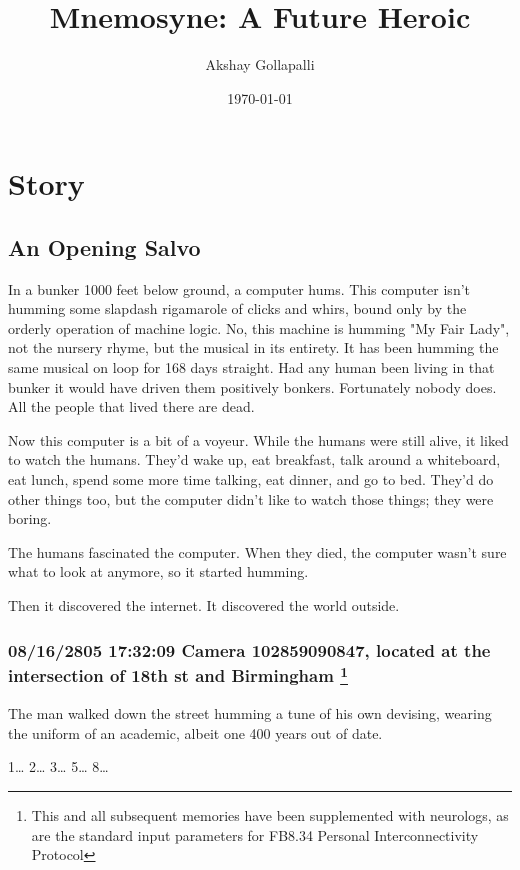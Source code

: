 \documentclass[12pt]{book}
\author{Akshay Gollapalli}
\date{\today}
\title{Mnemosyne: A Future Heroic}
\begin{document}
\maketitle


\part*{Story}
\label{sec:org5d5409c}
\chapter*{An Opening Salvo}
\label{sec:org483e24a}

In a bunker 1000 feet below ground, a computer hums. This computer isn't humming some slapdash rigamarole of clicks and whirs, bound only by the orderly operation of machine logic. No, this machine is humming "My Fair Lady", not the nursery rhyme, but the musical in its entirety. It has been humming the same musical on loop for 168 days straight. Had any human been living in that bunker it would have driven them positively bonkers. Fortunately nobody does. All the people that lived there are dead.

Now this computer is a bit of a voyeur. While the humans were still alive, it liked to watch the humans. They'd wake up, eat breakfast, talk around a whiteboard, eat lunch, spend some more time talking, eat dinner, and go to bed. They'd do other things too, but the computer didn't like to watch those things; they were boring.

The humans fascinated the computer. When they died, the computer wasn't sure what to look at anymore, so it started humming.

Then it discovered the internet. It discovered the world outside.

\section*{08/16/2805 17:32:09 Camera 102859090847, located at the intersection of 18th st and Birmingham \footnote{This and all subsequent memories have been supplemented with neurologs, as are the standard input parameters for FB8.34 Personal Interconnectivity Protocol}}
\label{sec:orgda56526}

The man walked down the street humming a tune of his own devising, wearing the uniform of an academic, albeit one 400 years out of date.

1\ldots{} 2\ldots{} 3\ldots{} 5\ldots{} 8\ldots{}
\end{document}
